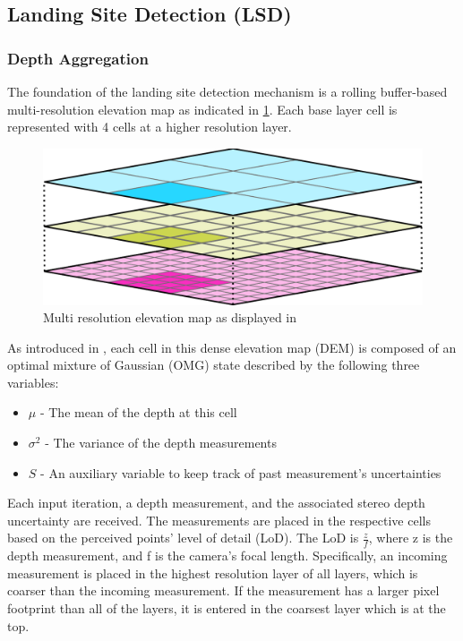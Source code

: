 \subsection{Landing Site Detection (LSD)}\label{subsec:setup:LSD}

\subsubsection{Depth Aggregation}\label{subsubsec:setup:aggregation}

The foundation of the landing site detection mechanism is a rolling buffer-based multi-resolution elevation map as indicated in \cref{fig:DEM}. Each base layer cell is represented with 4 cells at a higher resolution layer.

\begin{figure}[ht!]
    \centering
    \includegraphics[scale=0.25]{images/system_overview/DEM.png}
    \caption{Multi resolution elevation map as displayed in \citep{LSD1}}
    \label{fig:DEM}
\end{figure}

As introduced in \citet{LSD2}, each cell in this dense elevation map (DEM) is composed of an optimal mixture of Gaussian (OMG) state described by the following three variables:

\begin{itemize}
    \item $\mu$ - The mean of the depth at this cell
    \item $\sigma^2$ - The variance of the depth measurements
    \item $S$ - An auxiliary variable to keep track of past measurement's uncertainties
\end{itemize}

Each input iteration, a depth measurement, and the associated stereo depth uncertainty are received. The measurements are placed in the respective cells based on the perceived points' level of detail (LoD). The LoD is $\frac{z}{f}$, where z is the depth measurement, and f is the camera's focal length. Specifically, an incoming measurement is placed in the highest resolution layer of all layers, which is coarser than the incoming measurement. If the measurement has a larger pixel footprint than all of the layers, it is entered in the coarsest layer which is at the top.

